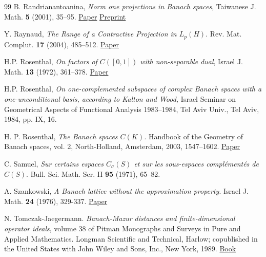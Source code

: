 \documentclass[11pt]{amsart}
\theoremstyle{definition}
\numberwithin{equation}{section}
\begin{document}
\begin{thebibliography}{99}
B. Randrianantoanina, \textit{Norm one projections in Banach spaces}, Taiwanese J. Math. \textbf{5} (2001), 35--95. \href{https://projecteuclid.org/journals/taiwanese-journal-of-mathematics/volume-5/issue-1/NORM-ONE-PROJECTIONS-IN-BANACH-SPACES/10.11650/twjm/1500574888.full}{Paper} \href{https://arxiv.org/abs/math/0110171}{Preprint}


Y. Raynaud, \textit{The Range of a Contractive Projection in $L_p(H)$}. Rev. Mat. Complut. \textbf{17} (2004), 485--512.
\href{https://doi.org/10.5209/rev_REMA.2004.v17.n2.16763}{Paper}


H.P. Rosenthal, \emph{On factors of $C([0, 1])$ with non-separable dual}, Israel J. Math. \textbf{13} (1972), 361--378. \href{https://doi.org/10.1007/BF02762811}{Paper}



H.P. Rosenthal, \emph{On one-complemented subspaces of complex Banach spaces with a one-unconditional basis, according to Kalton and Wood,} Israel Seminar on Geometrical Aspects of Functional Analysis 1983–1984, Tel Aviv Univ., Tel Aviv, 1984, pp. IX, 16. 


 H. P. Rosenthal,
\textit{The Banach spaces $C(K)$.}  Handbook of the Geometry of Banach spaces, vol. 2, North-Holland, Amsterdam, 2003,  1547--1602.
\href{https://doi.org/10.1016/S1874-5849(03)80043-8}{Paper} %


C. Samuel, \textit{Sur certains espaces $C_\sigma(S)$ et sur les sous-espaces complémentés de $C(S)$}. Bull. Sci. Math. Ser. II \textbf{95} (1971), 65--82.



A. Szankowski, \textit{A Banach lattice without the approximation property}. Israel J. Math. \textbf{24} (1976), 329-337. \href{https://doi.org/10.1007/BF02834763}{Paper}


N. Tomczak-Jaegermann. \emph{Banach-Mazur distances and finite-dimensional operator ideals}, volume 38 of Pitman Monographs and Surveys in Pure and Applied Mathematics. Longman Scientific and Technical, Harlow; copublished in the United States with John Wiley and Sons, Inc., New York, 1989. \href{https://sites.ualberta.ca/~ntj/bm_book/index.html}{Book}


\end{thebibliography}
\end{document}
